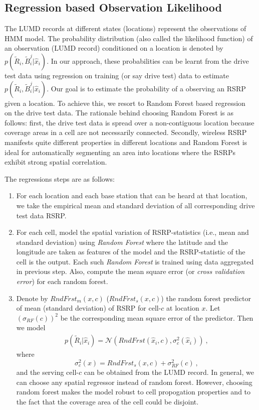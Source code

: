 \documentclass[conference, 10pt]{IEEEtran}
\begin{document}
\subsection{Regression based Observation Likelihood}
\label{sec:prob-reg}
The LUMD records at different states
(locations) represent the observations of HMM model. The probability
distribution (also called the likelihood function) of an observation (LUMD record) 
conditioned on a location is denoted by
$p(\tilde{R}_i, \tilde{B}^j_i|\hat{x}_{i})$. In our approach, these probabilities
can be learnt from the drive test data using regression on training (or say drive test) data to
estimate $p(\tilde{R}_i, \tilde{B}^j_i|\hat{x}_{i})$.
Our goal is to estimate the probability of a observing an RSRP given a location.  To
achieve this, we resort to Random Forest based regression~\cite{BreimanRandFor} on
the drive test data.  The rationale behind choosing Random Forest is as follows:
first, the drive test data is spread over a non-contiguous location because coverage
areas in a cell are not necessarily connected.  Secondly, wireless RSRP
manifests quite different properties in different locations and Random Forest is ideal
for automatically segmenting an area into locations where the RSRPs
exhibit strong spatial correlation.

The regressions steps are as follows:

\begin{enumerate}

\item For each location and each base station that can be heard at that location, we
take the empirical mean and standard deviation of all corresponding drive test data
RSRP. 

\item For each cell, model the spatial variation of RSRP-statistics (i.e., mean and
standard deviation) using {\em Random Forest} where the latitude and the longitude are 
taken as features of the model and the RSRP-statistic  of the cell is the output. Each such {\em
Random Forest} is trained using data aggregated in previous step. Also,
compute the mean square error (or {\em cross validation error})
for each random forest.

\item Denote by $RndFrst_m(x,c)$ ($RndFrst_s(x,c)$) the random forest predictor of
mean (standard deviation) of RSRP for cell-$c$
at location $x$. Let $(\sigma_{RF}(c))^2$ be the corresponding
mean square error of the predictor. Then we model
\begin{align}
p(\tilde{R}_i|\hat{x}_{i}) =
\mathcal{N}(RndFrst(\hat{x}_{i},c), \sigma_c^2(\hat{x}_i))\ ,
\end{align}
where $$\sigma_c^2(x) = RndFrst_s(x,c) + \sigma_{RF}^2(c)\ ,$$ 
and the serving cell-$c$ can be obtained from the LUMD record. In general, we
can choose any spatial regressor instead of random forest. However, choosing
random forest makes the model robust to cell propogation properties and to the
fact that the coverage area of the cell could be disjoint.

\end{enumerate}
\end{document}
